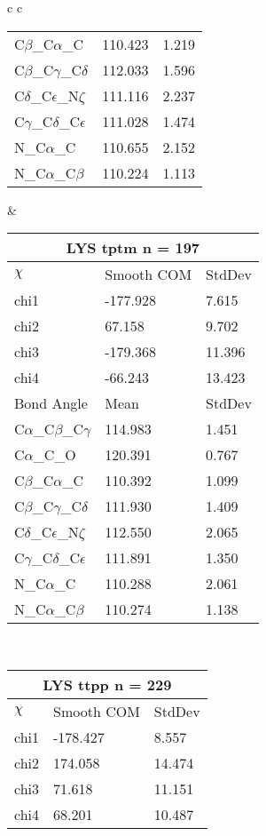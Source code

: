\begin{longtable}{ c c }
\begin{tabular}{ l l l }
  C$\beta$\_C$\alpha$\_C & 110.423 & 1.219\\
  C$\beta$\_C$\gamma$\_C$\delta$ & 112.033 & 1.596\\
  C$\delta$\_C$\epsilon$\_N$\zeta$ & 111.116 & 2.237\\
  C$\gamma$\_C$\delta$\_C$\epsilon$ & 111.028 & 1.474\\
  N\_C$\alpha$\_C & 110.655 & 2.152\\
  N\_C$\alpha$\_C$\beta$ & 110.224 & 1.113\\
  \bottomrule
  \end{tabular}
  &
  \begin{tabular}{ l l l }
  \toprule
  \multicolumn{3}{c}{LYS \textbf{tptm} n = 197} \\ \toprule
  $\chi$       & Smooth COM & StdDev \\ \midrule
  chi1 & -177.928 & 7.615 \\ 
  chi2 & 67.158 & 9.702 \\ 
  chi3 & -179.368 & 11.396 \\ 
  chi4 & -66.243 & 13.423 \\ \midrule
  Bond Angle   & Mean     & StdDev \\ \midrule
  C$\alpha$\_C$\beta$\_C$\gamma$ & 114.983 & 1.451\\
  C$\alpha$\_C\_O & 120.391 & 0.767\\
  C$\beta$\_C$\alpha$\_C & 110.392 & 1.099\\
  C$\beta$\_C$\gamma$\_C$\delta$ & 111.930 & 1.409\\
  C$\delta$\_C$\epsilon$\_N$\zeta$ & 112.550 & 2.065\\
  C$\gamma$\_C$\delta$\_C$\epsilon$ & 111.891 & 1.350\\
  N\_C$\alpha$\_C & 110.288 & 2.061\\
  N\_C$\alpha$\_C$\beta$ & 110.274 & 1.138\\
  \bottomrule
  \end{tabular}
  \\
  \begin{tabular}{ l l l }
  \toprule
  \multicolumn{3}{c}{LYS \textbf{ttpp} n = 229} \\ \toprule
  $\chi$       & Smooth COM & StdDev \\ \midrule
  chi1 & -178.427 & 8.557 \\ 
  chi2 & 174.058 & 14.474 \\ 
  chi3 & 71.618 & 11.151 \\ 
  chi4 & 68.201 & 10.487 \\ \midrule

\end{tabular}
\end{longtable}

